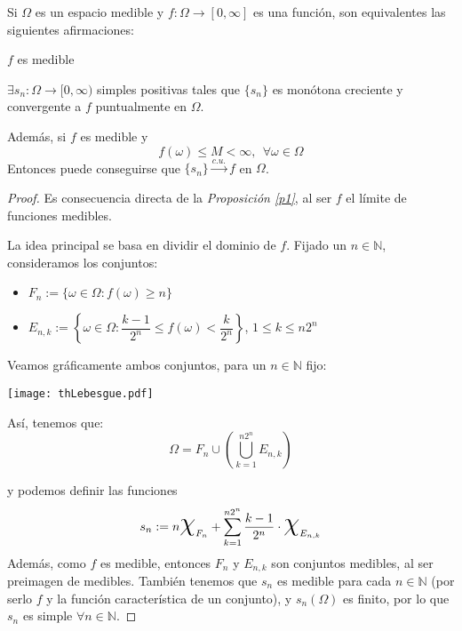 \begin{nth}
  Si $\Omega$ es un espacio medible y $f:\Omega \to [0,\infty]$ es una función, son equivalentes las siguientes afirmaciones:
  \begin{nlist}
  \item $f$ es medible
  \item $\exists s_n : \Omega \to [0,\infty)$ simples positivas tales que $\{s_n\}$ es monótona creciente y convergente a $f$ puntualmente en $\Omega$.
  \end{nlist}
  Además, si $f$ es medible y
  \[
    f(\omega) \leq M < \infty, \ \ \forall \omega \in \Omega
  \]
  Entonces puede conseguirse que $\{s_n\}\xrightarrow{c.u.}f$ en $\Omega$.
\end{nth}
\begin{proof}\hfill

  Es consecuencia directa de la \textit{Proposición \ref{p1}}, al ser $f$ el límite de funciones medibles.

   La idea principal se basa en dividir el dominio de $f$. Fijado un $n \in \mathbb{N}$, consideramos los conjuntos:
    \begin{itemize}
      \item $F_n := \{\omega \in \Omega : f(\omega) \geq n\}$\\
      \item $E_{n,k} := \left\{\omega \in \Omega : \dfrac{k-1}{2^n} \leq f(\omega) < \dfrac{k}{2^n}\right\}$,  $1 \leq k \leq n2^n$\\
    \end{itemize}

  Veamos gráficamente ambos conjuntos, para un $n\in \mathbb{N}$ fijo:
  \begin{center}
	\texttt{[image: thLebesgue.pdf]}
  \end{center}
  Así, tenemos que:
  \[
    \Omega = F_n \cup \left( \bigcup_{k=1}^{n2^n}E_{n,k} \right)
  \]

  y podemos definir las funciones
  \[
    s_n := n\text{\huge {$\chi$}}_{F_n} + \sum_{k=1}^{n2^n}\dfrac{k-1}{2^n}\cdot \text{\huge {$\chi$}}_{E_{n,k}}
  \]
  Además, como $f$ es medible, entonces $F_n$ y $E_{n,k}$ son conjuntos medibles, al ser preimagen de medibles. También tenemos que $s_n$ es medible para cada $n \in \mathbb{N}$ (por serlo $f$ y la función característica de un conjunto), y $s_n(\Omega)$ es finito, por lo que $s_n$ es simple $\forall n \in \mathbb{N}$.


\end{proof}
